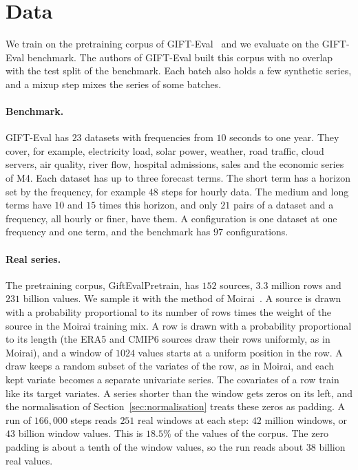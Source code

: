 \section{Data}
\label{sec:data}

We train on the pretraining corpus of GIFT-Eval~\citep{aksu2024gifteval}
and we evaluate on the GIFT-Eval benchmark. The authors of GIFT-Eval
built this corpus with no overlap with the test split of the
benchmark. Each batch also holds a few synthetic series, and a mixup
step mixes the series of some batches.

\paragraph{Benchmark.}
GIFT-Eval has $23$ datasets with frequencies from $10$ seconds to one
year. They cover, for example, electricity load, solar power, weather,
road traffic, cloud servers, air quality, river flow, hospital
admissions, sales and the economic series of M4. Each dataset has up to
three forecast terms. The short term has a horizon set by the
frequency, for example $48$ steps for hourly data. The medium and long
terms have $10$ and $15$ times this horizon, and only $21$ pairs of a dataset
and a frequency, all hourly or finer, have them. A configuration is one dataset at one
frequency and one term, and the benchmark has $97$ configurations.

\paragraph{Real series.}
The pretraining corpus, GiftEvalPretrain, has $152$ sources,
$3.3$ million rows and $231$ billion values. We sample it with the
method of Moirai~\citep{woo2024moirai}. A source is drawn with a
probability proportional to its number of rows times the weight of the
source in the Moirai training mix. A row is drawn with a probability
proportional to its length (the ERA5 and CMIP6 sources draw their rows
uniformly, as in Moirai), and a window of $1024$ values starts at a
uniform position in the row. A draw keeps a random subset of the
variates of the row, as in Moirai, and each kept variate becomes a
separate univariate series. The covariates of a row train like its
target variates. A series shorter than the window gets zeros on its
left, and the normalisation of Section~\ref{sec:normalisation} treats
these zeros as padding. A run of $166{,}000$ steps reads $251$ real
windows at each step: $42$ million windows, or $43$ billion window
values. This is $18.5\%$ of the values of the corpus. The zero padding
is about a tenth of the window values, so the run reads about $38$
billion real values.

